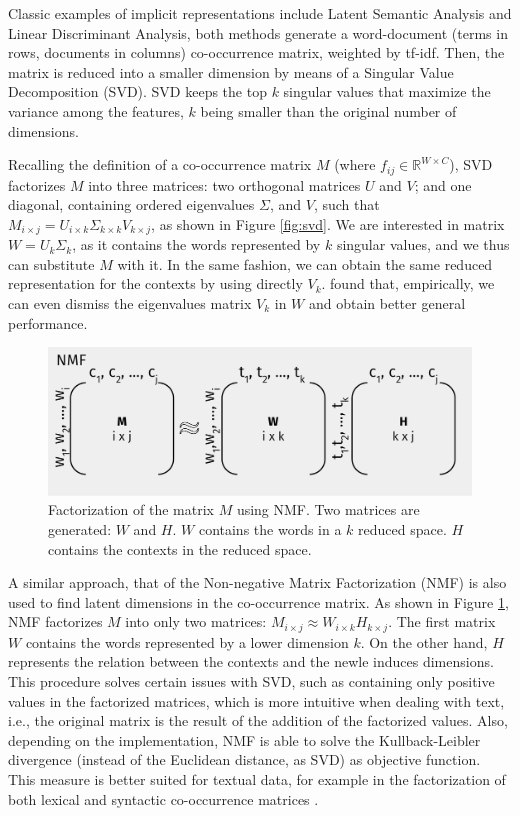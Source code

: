 Classic examples of implicit representations include Latent Semantic Analysis and Linear Discriminant Analysis, both methods generate a word-document (terms in rows, documents in columns) co-occurrence matrix, weighted by tf-idf. Then, the matrix is reduced into a smaller dimension by means of a Singular Value Decomposition (SVD). SVD keeps the top $k$ singular values that maximize the variance among the features, $k$ being smaller than the original number of dimensions.

Recalling  the  definition of a co-occurrence matrix $M$ (where $f_{ij} \in \mathbb{R}^{W\times C}$), SVD factorizes $M$ into three matrices: two orthogonal matrices $U$ and $V$; and one diagonal, containing ordered eigenvalues $\Sigma$, and $V$, such that $M_{i\times j} = U_{i\times k}\Sigma_{k\times k}V_{k\times j}$, as shown in Figure \ref{fig:svd}. We are interested in matrix $W= U_k\Sigma_k$, as it  contains the words represented by $k$ singular values, and we thus can substitute $M$ with it. In the same fashion, we can obtain the same reduced representation for the contexts by using directly $V_k$. \cite{levy2015improving} found that, empirically, we can even dismiss the eigenvalues matrix $V_k$ in $W$ and obtain better general performance.


\begin{figure}
\centering
\includegraphics[width=.8\linewidth]{images/Chapitre2/nmf.pdf}
\caption{Factorization of the matrix $M$ using NMF. Two matrices are generated: $W$ and $H$. $W$ contains the words in a $k$ reduced space. $H$ contains the contexts in the reduced space.}
\label{fig:nmf}
\end{figure}

A similar approach, that of the Non-negative Matrix Factorization \cite{lee2001algorithms} (NMF)  is  also used to find latent  dimensions in the co-occurrence matrix. As shown in Figure \ref{fig:nmf}, NMF factorizes $M$ into only two matrices: $M_{i \times j} \approx W_{i\times k} H_{k\times j}$. The first matrix $W$ contains the words represented by a lower dimension $k$. On the other hand, $H$ represents the relation between the contexts and the newle induces dimensions. This procedure solves certain issues with SVD, such as containing only positive values in the factorized matrices, which is more intuitive when dealing with text, i.e., the original matrix is the result of the addition of the factorized values. Also, depending on the implementation, NMF is able to solve the Kullback-Leibler divergence (instead of the Euclidean distance, as SVD) as objective function. This measure is better suited for textual data, for example in the factorization of both lexical and syntactic co-occurrence matrices \cite{VandeCruys2011}.
 


